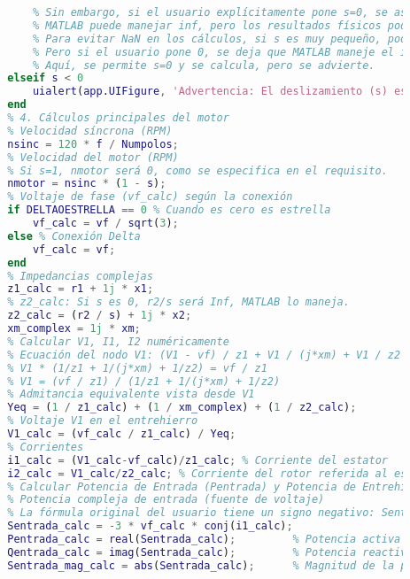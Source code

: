 \begin{lstlisting}[language=Matlab, caption={MATLAB Code}, basicstyle=\footnotesize\ttfamily]
            % Si s es 0, r2/s sería infinito. En un motor real, s nunca es exactamente 0 con carga.
            % Sin embargo, si el usuario explícitamente pone s=0, se asume que no hay carga.
            % MATLAB puede manejar inf, pero los resultados físicos podrían no ser los esperados.
            % Para evitar NaN en los cálculos, si s es muy pequeño, podemos forzar un mínimo.
            % Pero si el usuario pone 0, se deja que MATLAB maneje el inf/nan si ocurre.
            % Aquí, se permite s=0 y se calcula, pero se advierte.
        elseif s < 0
            uialert(app.UIFigure, 'Advertencia: El deslizamiento (s) es negativo. Esto indica operación de frenado o generación. Los resultados pueden no ser típicos de operación motora.', 'Advertencia de Deslizamiento', 'Icon', 'warning');
        end
        % 4. Cálculos principales del motor
        % Velocidad síncrona (RPM)
        nsinc = 120 * f / Numpolos;
        % Velocidad del motor (RPM)
        % Si s=1, nmotor será 0, como se especifica en el requisito.
        nmotor = nsinc * (1 - s);
        % Voltaje de fase (vf_calc) según la conexión
        if DELTAOESTRELLA == 0 % Cuando es cero es estrella
            vf_calc = vf / sqrt(3);
        else % Conexión Delta
            vf_calc = vf;
        end
        % Impedancias complejas
        z1_calc = r1 + 1j * x1;
        % z2_calc: Si s es 0, r2/s será Inf, MATLAB lo maneja.
        z2_calc = (r2 / s) + 1j * x2;
        xm_complex = 1j * xm;
        % Calcular V1, I1, I2 numéricamente
        % Ecuación del nodo V1: (V1 - vf) / z1 + V1 / (j*xm) + V1 / z2 = 0
        % V1 * (1/z1 + 1/(j*xm) + 1/z2) = vf / z1
        % V1 = (vf / z1) / (1/z1 + 1/(j*xm) + 1/z2)
        % Admitancia equivalente vista desde V1
        Yeq = (1 / z1_calc) + (1 / xm_complex) + (1 / z2_calc);
        % Voltaje V1 en el entrehierro
        V1_calc = (vf_calc / z1_calc) / Yeq;
        % Corrientes
        i1_calc = (V1_calc-vf_calc)/z1_calc; % Corriente del estator
        i2_calc = V1_calc/z2_calc; % Corriente del rotor referida al estator
        % Calcular Potencia de Entrada (Pentrada) y Potencia de Entrehierro (Peh)
        % Potencia compleja de entrada (fuente de voltaje)
        % La fórmula original del usuario tiene un signo negativo: Sentrada_calc = -3 * vf_calc * conj(i1_calc);
        Sentrada_calc = -3 * vf_calc * conj(i1_calc);
        Pentrada_calc = real(Sentrada_calc);         % Potencia activa de entrada
        Qentrada_calc = imag(Sentrada_calc);         % Potencia reactiva de entrada
        Sentrada_mag_calc = abs(Sentrada_calc);      % Magnitud de la potencia aparente de entrada

\end{lstlisting}
